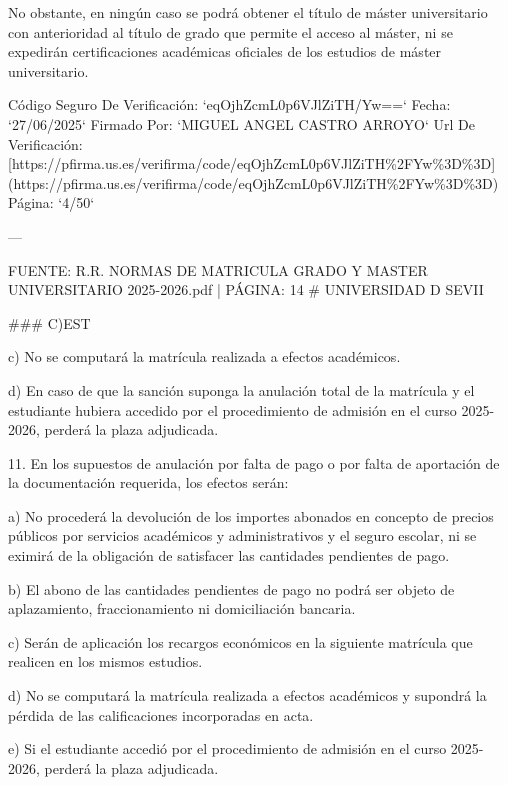 \documentclass{article}
\begin{document}
\begin{itemize}
\begin{itemize}
\begin{scriptsize}
                  No obstante, en ningún caso se podrá obtener el título de máster universitario con anterioridad al título de grado que permite el acceso al máster, ni se expedirán certificaciones académicas oficiales de los estudios de máster universitario.

                  Código Seguro De Verificación: `eqOjhZcmL0p6VJlZiTH/Yw==`
                  Fecha: `27/06/2025`
                  Firmado Por: `MIGUEL ANGEL CASTRO ARROYO`
                  Url De Verificación: [https://pfirma.us.es/verifirma/code/eqOjhZcmL0p6VJlZiTH\%2FYw\%3D\%3D](https://pfirma.us.es/verifirma/code/eqOjhZcmL0p6VJlZiTH\%2FYw\%3D\%3D)
                  Página: `4/50`

                  ---

                  FUENTE: R.R. NORMAS DE MATRICULA GRADO Y MASTER UNIVERSITARIO 2025-2026.pdf | PÁGINA: 14
                  \# UNIVERSIDAD D SEVII

                  \#\#\# C)EST

                  c) No se computará la matrícula realizada a efectos académicos.

                  d) En caso de que la sanción suponga la anulación total de la matrícula y el estudiante hubiera accedido por el procedimiento de admisión en el curso 2025-2026, perderá la plaza adjudicada.

                  11. En los supuestos de anulación por falta de pago o por falta de aportación de la documentación requerida, los efectos serán:

                  a) No procederá la devolución de los importes abonados en concepto de precios públicos por servicios académicos y administrativos y el seguro escolar, ni se eximirá de la obligación de satisfacer las cantidades pendientes de pago.

                  b) El abono de las cantidades pendientes de pago no podrá ser objeto de aplazamiento, fraccionamiento ni domiciliación bancaria.

                  c) Serán de aplicación los recargos económicos en la siguiente matrícula que realicen en los mismos estudios.

                  d) No se computará la matrícula realizada a efectos académicos y supondrá la pérdida de las calificaciones incorporadas en acta.

                  e) Si el estudiante accedió por el procedimiento de admisión en el curso 2025-2026, perderá la plaza adjudicada.


\end{scriptsize}
\end{itemize}
\end{itemize}
\end{document}

